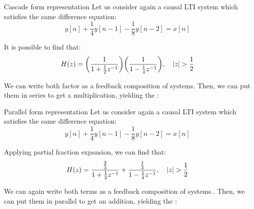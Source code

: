 \documentclass[a4paper]{article}
\begin{document}
\begin{parag}{Cascade form representation}
    Let us consider again a causal LTI system which satisfies the same difference equation: 
    \[y\left[n\right] + \frac{1}{4} y\left[n-1\right] - \frac{1}{8}y\left[n-2\right] = x\left[n\right]\]
    
    It is possible to find that: 
    \[H\left(z\right) = \left(\frac{1}{1 + \frac{1}{2}z^{-1}}\right) \left(\frac{1}{1 - \frac{1}{4}z^{-1}}\right), \mathspace \left|z\right| > \frac{1}{2}\]

    We can write both factor as a feedback composition of systems. Then, we can put them in series to get a multiplication, yielding the :
\end{parag}

\begin{parag}{Parallel form representation}
    Let us consider again a causal LTI system which satisfies the same difference equation: 
    \[y\left[n\right] + \frac{1}{4} y\left[n-1\right] - \frac{1}{8}y\left[n-2\right] = x\left[n\right]\]
    
    Applying partial fraction expansion, we can find that: 
    \[H\left(z\right) = \frac{\frac{2}{3}}{1 + \frac{1}{2}z^{-1}} + \frac{\frac{1}{3}}{1 - \frac{1}{4}z^{-1}}, \mathspace \left|z\right| > \frac{1}{2}\]
    
    We can again write both terms as a feedback composition of systems.. Then, we can put them in parallel to get an addition, yielding the : 
\end{parag}
\end{document}
